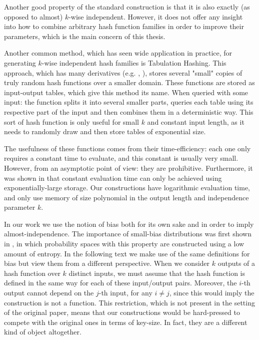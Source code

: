 \documentclass[12pt]{article}
\begin{document}
	Another good property of the standard construction is that it is also exactly (as opposed to almost) $k$-wise independent.
	However, it does not offer any insight into how to combine arbitrary hash function families in order to improve their parameters, which is the main concern of this thesis.
	
	Another common method, which has seen wide application in practice, for generating $k$-wise independent hash families is 
	Tabulation Hashing.
	This approach, which has many derivatives (e.g. \cite{4UniversalSecondMoment}, \cite{Twisted}), stores several "small" copies of truly random hash functions over a smaller domain.
	These functions are stored as input-output tables, which give this method its name.
	When queried with some input: the function splits it into several smaller parts, queries each table using its respective part of the input and then combines them in a deterministic way.
	This sort of hash function is only useful for small $k$ and constant input length, as it needs to randomly draw and then store tables of exponential size.
	
	The usefulness of these functions comes from their time-efficiency: each one only requires a constant time to evaluate, and this constant is usually very small.
	However, from an asymptotic point of view: they are prohibitive.
	Furthermore, it was shown in \cite{Concentrators} that constant evaluation time can only be achieved using exponentially-large storage.
	Our constructions have logarithmic evaluation time, and only use memory of size polynomial in the output length and independence parameter $k$.
	
	In our work we use the notion of bias both for its own sake and in order to imply almost-independence.
	The importance of small-bias distributions was first shown in \cite{SmallBias}, in which probability spaces with this property are constructed using a low amount of entropy.
	In the following text we make use of the same definitions for bias but view them from a different perspective.
	When we consider $k$ outputs of a hash function over $k$ distinct inputs, we must assume that the hash function is defined in the same way for each of these input/output pairs.
	Moreover, the $i$-th output cannot depend on the $j$-th input, for any $i \neq j$, since this would imply the construction is not a function.
	This restriction, which is not present in the setting of the original paper, means that our constructions would be hard-pressed to compete with the original ones in terms of key-size.
	In fact, they are a different kind of object altogether.
	
\end{document}
